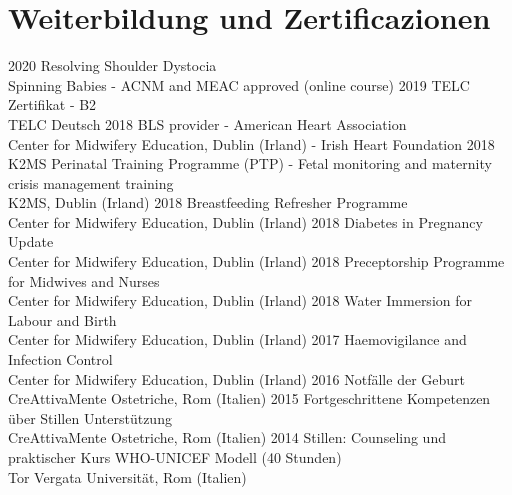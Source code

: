 \documentclass[11pt]{friggeri-cv}
\begin{document}
\section{Weiterbildung und Zertificazionen}
\begin{entrylist}
  \entry
    {2020}
    {Resolving Shoulder Dystocia}
    {\\Spinning Babies - ACNM and MEAC approved (online course)}
    {\vspace{-10pt}}
  \entry
    {2019}
    {TELC Zertifikat - B2}
    {\\TELC Deutsch}
    {\vspace{-10pt}}
  \entry
    {2018}
    {BLS provider - American Heart Association}
    {\\Center for Midwifery Education, Dublin (Irland) - Irish Heart Foundation}
    {\vspace{-10pt}}
  \entry
    {2018}
    {K2MS Perinatal Training Programme (PTP) - Fetal monitoring and maternity crisis management training}
    {\\K2MS, Dublin (Irland)}
    {\vspace{-10pt}}
  \entry
    {2018}
    {Breastfeeding Refresher Programme}
    {\\Center for Midwifery Education, Dublin (Irland)}
    {\vspace{-10pt}}
  \entry
    {2018}
    {Diabetes in Pregnancy Update}
    {\\Center for Midwifery Education, Dublin (Irland)}
    {\vspace{-10pt}}
  \entry
    {2018}
    {Preceptorship Programme for Midwives and Nurses}
    {\\Center for Midwifery Education, Dublin (Irland)}
    {\vspace{-10pt}}
  \entry
    {2018}
    {Water Immersion for Labour and Birth}
    {\\Center for Midwifery Education, Dublin (Irland)}
    {\vspace{-10pt}}
  \entry
    {2017}
    {Haemovigilance and Infection Control}
    {\\Center for Midwifery Education, Dublin (Irland)}
    {\vspace{-10pt}}
  \entry
    {2016}
    {Notf\"{a}lle der Geburt}
    {\\CreAttivaMente Ostetriche, Rom (Italien)}
    {\vspace{-10pt}}
  \entry
    {2015}
    {Fortgeschrittene Kompetenzen \"{u}ber Stillen Unterst\"{u}tzung}
    {\\CreAttivaMente Ostetriche, Rom (Italien)}
    {\vspace{-10pt}}
  \entry
    {2014}
    {Stillen: Counseling und praktischer Kurs WHO-UNICEF Modell (40 Stunden)}
    {\\Tor Vergata Universit\"{a}t, Rom (Italien)}
    {\vspace{-10pt}}
\end{entrylist}
\end{document}
